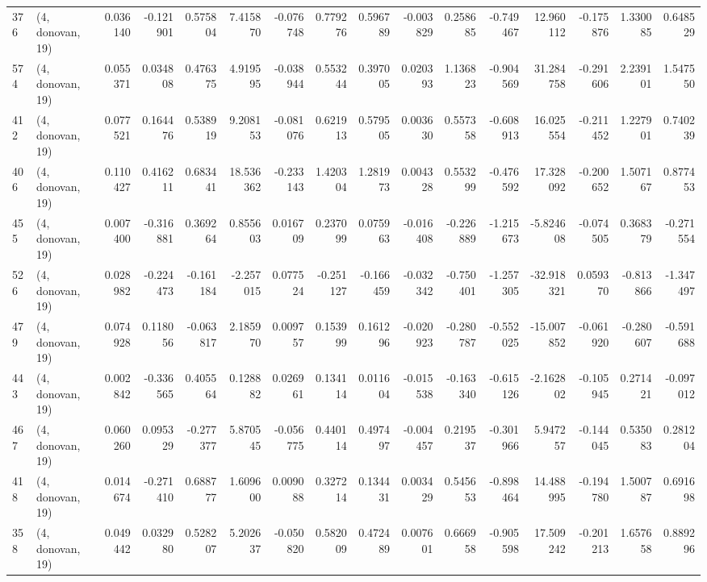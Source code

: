 \begin{tabular}{llrrrrrrrrrrrrrr}
376 &  (4, donovan, 19) &   0.036140 & -0.121901 &  0.575804 &    7.415870 & -0.076748 &   0.779276 &   0.596789 & -0.003829 &  0.258685 & -0.749467 &   12.960112 & -0.175876 &   1.330085 &   0.648529 \\
574 &  (4, donovan, 19) &   0.055371 &  0.034808 &  0.476375 &    4.919595 & -0.038944 &   0.553244 &   0.397005 &  0.020393 &  1.136823 & -0.904569 &   31.284758 & -0.291606 &   2.239101 &   1.547550 \\
412 &  (4, donovan, 19) &   0.077521 &  0.164476 &  0.538919 &    9.208153 & -0.081076 &   0.621913 &   0.579505 &  0.003630 &  0.557358 & -0.608913 &   16.025554 & -0.211452 &   1.227901 &   0.740239 \\
406 &  (4, donovan, 19) &   0.110427 &  0.416211 &  0.683441 &   18.536362 & -0.233143 &   1.420304 &   1.281973 &  0.004328 &  0.553299 & -0.476592 &   17.328092 & -0.200652 &   1.507167 &   0.877453 \\
455 &  (4, donovan, 19) &   0.007400 & -0.316881 &  0.369264 &    0.855603 &  0.016709 &   0.237099 &   0.075963 & -0.016408 & -0.226889 & -1.215673 &   -5.824608 & -0.074505 &   0.368379 &  -0.271554 \\
526 &  (4, donovan, 19) &   0.028982 & -0.224473 & -0.161184 &   -2.257015 &  0.077524 &  -0.251127 &  -0.166459 & -0.032342 & -0.750401 & -1.257305 &  -32.918321 &  0.059370 &  -0.813866 &  -1.347497 \\
479 &  (4, donovan, 19) &   0.074928 &  0.118056 & -0.063817 &    2.185970 &  0.009757 &   0.153999 &   0.161296 & -0.020923 & -0.280787 & -0.552025 &  -15.007852 & -0.061920 &  -0.280607 &  -0.591688 \\
443 &  (4, donovan, 19) &   0.002842 & -0.336565 &  0.405564 &    0.128882 &  0.026961 &   0.134114 &   0.011604 & -0.015538 & -0.163340 & -0.615126 &   -2.162802 & -0.105945 &   0.271421 &  -0.097012 \\
467 &  (4, donovan, 19) &   0.060260 &  0.095329 & -0.277377 &    5.870545 & -0.056775 &   0.440114 &   0.497497 & -0.004457 &  0.219537 & -0.301966 &    5.947257 & -0.144045 &   0.535083 &   0.281204 \\
418 &  (4, donovan, 19) &   0.014674 & -0.271410 &  0.688777 &    1.609600 &  0.009088 &   0.327214 &   0.134431 &  0.003429 &  0.545653 & -0.898464 &   14.488995 & -0.194780 &   1.500787 &   0.691698 \\
358 &  (4, donovan, 19) &   0.049442 &  0.032980 &  0.528207 &    5.202637 & -0.050820 &   0.582009 &   0.472489 &  0.007601 &  0.666958 & -0.905598 &   17.509242 & -0.201213 &   1.657658 &   0.889296 \\

\end{tabular}
